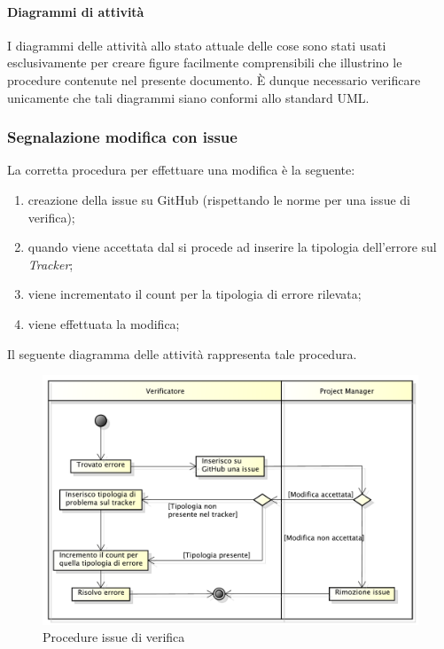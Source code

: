 			\paragraph{Diagrammi di attività}
				I diagrammi delle attività allo stato attuale delle cose sono stati usati esclusivamente per creare figure facilmente comprensibili che illustrino le procedure contenute nel presente documento. È dunque necessario verificare unicamente che tali diagrammi siano conformi allo standard UML.
		\subsubsection{Segnalazione modifica con issue}
			La corretta procedura per effettuare una modifica è la seguente:
			\begin{enumerate}
				\item creazione della issue su GitHub (rispettando le norme per una issue di verifica);
				\item quando viene accettata dal  si procede ad inserire la tipologia dell'errore sul \textit{Tracker};
				\item viene incrementato il count per la tipologia di errore rilevata;
				\item viene effettuata la modifica;
			\end{enumerate}
			Il seguente diagramma delle attività rappresenta tale procedura.
			\begin{figure}[H]\centering
				\includegraphics[width=\textwidth]{NormeDiProgetto/Pics/ProceduraIssueDiVerifica.pdf}
				\caption{Procedure issue di verifica}
			\end{figure}
